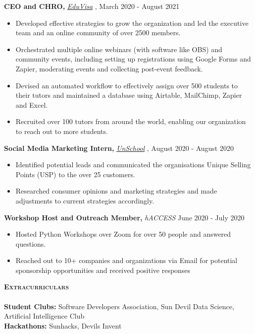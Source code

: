 \documentclass[a4paper]{article}
\newcommand{\lineunder} {
    \vspace*{-8pt} \\
    \hspace*{-18pt} \hrulefill \\
}
\newcommand{\header} [1] {
    {\hspace*{-15pt}\vspace*{3pt} \textsc{#1}}
    \vspace*{-6pt} \lineunder
}
\begin{document}
\textbf{CEO and CHRO, }\textit{{\href{https://myeduvisa.org/}{EduVisa}} \faExternalLink},   \hfill March 2020 - August 2021\\
\vspace{-3mm}
\begin{itemize} \itemsep 1pt
	\item Developed effective strategies to grow the organization and led the executive team and an online community of over 2500 members.
	\item Orchestrated multiple online webinars (with software like OBS) and community events, including setting up registrations using Google Forms and Zapier, moderating events and collecting post-event feedback.
	\item Devised an automated workflow to effectively assign over 500 students to their tutors and maintained a database using Airtable, MailChimp, Zapier and Excel.
	\item Recruited over 100 tutors from around the world, enabling our organization to reach out to more students.
\end{itemize}

\textbf{Social Media Marketing Intern, }\textit{{\href{https://www.unschool.in/}{UnSchool}} \faExternalLink},  \hfill August 2020 - August 2020\\
\vspace{-3mm}
\begin{itemize} \itemsep 1pt
	\item Identified potential leads and communicated the organisation\textquotesingle{}s Unique Selling Points (USP) to the over 25 customers.
	\item Researched consumer opinions and marketing strategies and made adjustments to current strategies accordingly.
\end{itemize}

\textbf{Workshop Host and Outreach Member, }\textit{hACCESS}  \hfill June 2020 - July 2020\\
\vspace{-3mm}
\begin{itemize} \itemsep 1pt
	\item Hosted Python Workshops over Zoom for over 50 people and answered questions.
	\item Reached out to 10+ companies and organizations via Email for potential sponsorship opportunities and received positive responses
\end{itemize}

\vspace{-2mm}


\header{\textbf{Extracurriculars}}


\textbf{Student Clubs:} Software Developers Association, Sun Devil Data Science, Artificial Intelligence Club \\
\textbf{Hackathons:} Sunhacks, Devils Invent



\vspace{-50mm}
    


\ 
\end{document}

